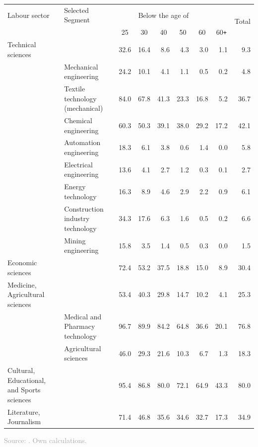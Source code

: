 \documentclass[11pt, aspectratio=1610, xcolor={dvipsnames}]{beamer}
\newcommand*{\myalign}[2]{\multicolumn{1}{#1}{#2}}
\begin{document}
\begin{frame}
{\begin{table}[h]
				\begin{tabular}{llrrrrrrr}
					\toprule
					Labour sector & Selected Segment & \multicolumn{5}{c}{Below the age of} & & \multirow[c]{2}{*}{Total} \\
					& & \myalign{c}{25} & \myalign{c}{30} & \myalign{c}{40} & \myalign{c}{50} & \myalign{c}{60} & \myalign{c}{60\texttt{+}} & \\
					\midrule
					Technical sciences & & 32.6 & 16.4 & 8.6 & 4.3 & 3.0 & 1.1 & 9.3 \\
					& Mechanical engineering & 24.2 & 10.1 & 4.1 & 1.1 & 0.5 & 0.2 & 4.8 \\
					& Textile technology (mechanical) & 84.0 & 67.8 & 41.3 & 23.3 & 16.8 & 5.2 & 36.7 \\
					& Chemical engineering & 60.3 & 50.3 & 39.1 & 38.0 & 29.2 & 17.2 & 42.1 \\
					& Automation engineering & 18.3 & 6.1 & 3.8 & 0.6 & 1.4 & 0.0 & 5.8 \\
					& Electrical engineering & 13.6 & 4.1 & 2.7 & 1.2 & 0.3 & 0.1 & 2.7 \\
					& Energy technology & 16.3 & 8.9 & 4.6 & 2.9 & 2.2 & 0.9 & 6.1 \\
					& Construction industry technology & 34.3 & 17.6 & 6.3 & 1.6 & 0.5 & 0.2 & 6.6 \\
					& Mining engineering &  15.8 & 3.5 & 1.4 & 0.5 & 0.3 & 0.0 & 1.5 \\
					Economic sciences & & 72.4 & 53.2 & 37.5 & 18.8 & 15.0 & 8.9 & 30.4 \\
					Medicine, Agricultural sciences & & 53.4 & 40.3 & 29.8 & 14.7 & 10.2 & 4.1 & 25.3 \\
					& Medical and Pharmacy technology & 96.7 & 89.9 & 84.2 &  64.8 & 36.6 & 20.1 & 76.8 \\
					& Agricultural sciences & 46.0 & 29.3 & 21.6 & 10.3 & 6.7 & 1.3 & 18.3 \\
					Cultural, Educational, and Sports sciences & & 95.4 & 86.8 & 80.0 & 72.1 & 64.9 & 43.3 & 80.0 \\
					Literature, Journalism & & 71.4 & 46.8 & 35.6 & 34.6 & 32.7 & 17.3 & 34.9 \\
					\bottomrule
				\end{tabular}
			\end{table}
		}
		
		{\scriptsize
			\textcolor{darkgray}{Source: \cite[p. 442]{DDRJahrbuch1973}. Own calculations.}
		}
		
		
	\end{frame}
	
\end{document}
